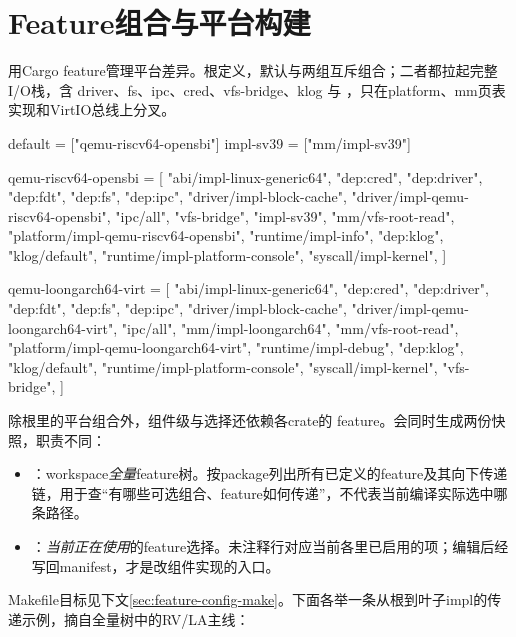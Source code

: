 \section{Feature组合与平台构建}

\wateros{}用Cargo feature管理平台差异。根定义，默认与两组互斥组合；二者都拉起完整I/O栈，含 driver、fs、ipc、cred、vfs-bridge、klog 与 ，只在platform、mm页表实现和VirtIO总线上分叉。

\begin{tomlcode}
[features]
default = ["qemu-riscv64-opensbi"]
impl-sv39 = ["mm/impl-sv39"]

qemu-riscv64-opensbi = [
  "abi/impl-linux-generic64",
  "dep:cred", "dep:driver", "dep:fdt", "dep:fs", "dep:ipc",
  "driver/impl-block-cache",
  "driver/impl-qemu-riscv64-opensbi",
  "ipc/all",
  "vfs-bridge",
  "impl-sv39",
  "mm/vfs-root-read",
  "platform/impl-qemu-riscv64-opensbi",
  "runtime/impl-info",
  "dep:klog", "klog/default",
  "runtime/impl-platform-console",
  "syscall/impl-kernel",
]

qemu-loongarch64-virt = [
  "abi/impl-linux-generic64",
  "dep:cred", "dep:driver", "dep:fdt", "dep:fs", "dep:ipc",
  "driver/impl-block-cache",
  "driver/impl-qemu-loongarch64-virt",
  "ipc/all",
  "mm/impl-loongarch64",
  "mm/vfs-root-read",
  "platform/impl-qemu-loongarch64-virt",
  "runtime/impl-debug",
  "dep:klog", "klog/default",
  "runtime/impl-platform-console",
  "syscall/impl-kernel",
  "vfs-bridge",
]
\end{tomlcode}

除根里的平台组合外，组件级与选择还依赖各crate的 feature。会同时生成两份快照，职责不同：

\begin{itemize}
 \item {}：workspace\emph{全量}feature树。按package列出所有已定义的feature及其向下传递链，用于查``有哪些可选组合、feature如何传递''，不代表当前编译实际选中哪条路径。
 \item {}：\emph{当前正在使用}的feature选择。未注释行对应当前各里已启用的项；编辑后经写回manifest，才是改组件实现的入口。
\end{itemize}

Makefile目标见下文\ref{sec:feature-config-make}。下面各举一条从根到叶子impl的传递示例，摘自全量树中的RV/LA主线：

